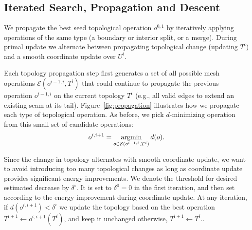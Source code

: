 \subsection{Iterated Search, Propagation and Descent}
\label{sec:topology_search}

We propagate the best seed topological operation $o^{0,1}$ by iteratively applying operations of the same type (a boundary or interior split, or a merge). During primal update we alternate between propagating topological change (updating $T^i$) and a smooth coordinate update over $U^i$.



Each topology propagation step first generates a set of all possible mesh operations $\mathcal{E}(o^{i-1, i}, T^{i})$ that could continue to propagate the previous operation $o^{i-1, i}$ on the current topology $T^{i}$ (e.g., all valid edges to extend an existing seam at its tail). Figure~\ref{fig:propagation} illustrates how we propagate each type of topological operation.
%
As before, we pick $d$-minimizing operation from this small set of candidate operations:
\begin{align}
\label{eq:minE}
o^{i,i+1} = \operatorname*{argmin}_{o \in \mathcal{E}(o^{i-1, i}, T^i)} d(o).
\end{align}

Since the change in topology alternates with smooth coordinate update, we want to avoid introducing too many topological changes as long as coordinate update provides significant energy improvements. We denote the threshold for desired estimated decrease by $\delta^{i}$. It is set to $\delta^0=0$ in the first iteration, and then set according to the energy improvement during coordinate update. At any iteration, if $d(o^{i,i+1}) < \delta^{i}$ we update the topology based on the best operation $T^{i+1} \leftarrow o^{i, i+1}(T^{i})$, and keep it unchanged otherwise, $T^{i+1} \leftarrow T^i.$.


